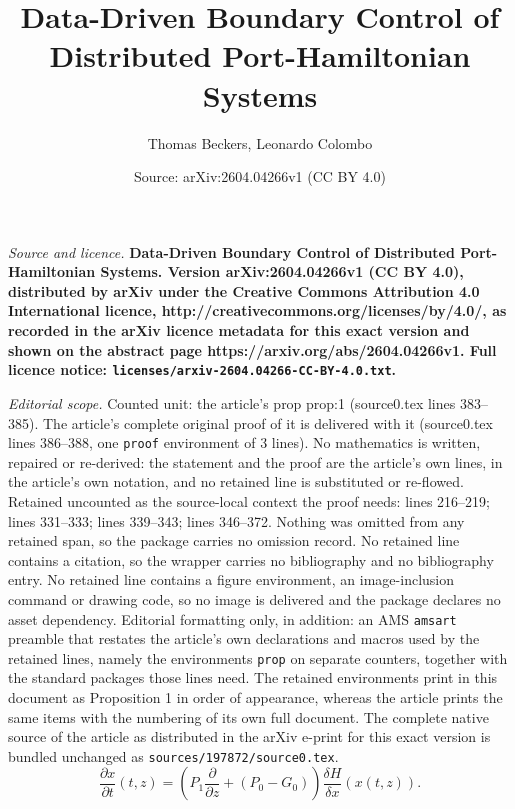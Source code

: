\documentclass[10pt,a4paper]{amsart}
\title{\LARGE \bf Data-Driven Boundary Control of Distributed Port-Hamiltonian Systems}
\author{Thomas Beckers, Leonardo Colombo}
\date{Source: arXiv:2604.04266v1 (CC BY 4.0)}
\begin{document}
\maketitle

\noindent\emph{Source and licence.} \LARGE \bf Data-Driven Boundary Control of Distributed Port-Hamiltonian Systems. Version arXiv:2604.04266v1 (CC BY 4.0), distributed by arXiv under the Creative Commons Attribution 4.0 International licence, http://creativecommons.org/licenses/by/4.0/, as recorded in the arXiv licence metadata for this exact version and shown on the abstract page https://arxiv.org/abs/2604.04266v1. Full licence notice: \texttt{licenses/arxiv-2604.04266-CC-BY-4.0.txt}.\par\smallskip

\noindent\textit{Editorial scope.} Counted unit: the article's prop prop:1 (source0.tex lines 383--385). The article's complete original proof of it is delivered with it (source0.tex lines 386--388, one \texttt{proof} environment of 3 lines). No mathematics is written, repaired or re-derived: the statement and the proof are the article's own lines, in the article's own notation, and no retained line is substituted or re-flowed.  Retained uncounted as the source-local context the proof needs: lines 216--219; lines 331--333; lines 339--343; lines 346--372.  Nothing was omitted from any retained span, so the package carries no omission record.  No retained line contains a citation, so the wrapper carries no bibliography and no bibliography entry.  No retained line contains a figure environment, an image-inclusion command or drawing code, so no image is delivered and the package declares no asset dependency.  Editorial formatting only, in addition: an AMS \texttt{amsart} preamble that restates the article's own declarations and macros used by the retained lines, namely the environments \texttt{prop} on separate counters, together with the standard packages those lines need.  The retained environments print in this document as Proposition 1 in order of appearance, whereas the article prints the same items with the numbering of its own full document.  The complete native source of the article as distributed in the arXiv e-print for this exact version is bundled unchanged as \texttt{sources/197872/source0.tex}.
\begin{equation}
\frac{\partial x}{\partial t}(t,z) = \left(P_1 \frac{\partial}{\partial z}  + (P_0 - G_0)\right)\frac{\delta H}{\delta x}(x(t,z)).
\label{for:pch}
\end{equation}
\end{document}
